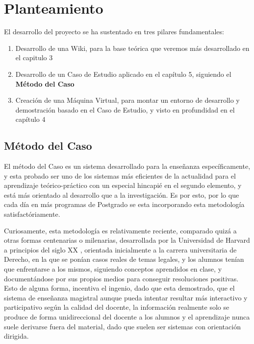
\section{Planteamiento}

El desarrollo del proyecto se ha sustentado en tres pilares fundamentales:

\begin{enumerate}
	\item Desarrollo de una Wiki, para la base teórica que veremos más desarrollado en el capitulo 3
	\item Desarrollo de un Caso de Estudio aplicado en el capítulo 5, siguiendo el \textbf{Método del Caso}
	\item Creación de una Máquina Virtual, para montar un entorno de desarrollo y demostración basado en el Caso de Estudio, y visto en profundidad en el capítulo 4
\end{enumerate}

\subsection{Método del Caso}

El método del Caso es un sistema desarrollado para la enseñanza específicamente, y esta probado ser uno de los sistemas más eficientes de la actualidad para el aprendizaje teórico-práctico con un especial hincapié en el segundo elemento, y está más orientado al desarrollo que a la investigación. Es por esto, por lo que cada día en más programas de Postgrado se esta incorporando esta metodología satisfactóriamente.

Curiosamente, esta metodología es relativamente reciente, comparado quizá a otras formas centenarias o milenarias, desarrollada por la Universidad de Harvard\cite{website:hbsp} a principios del siglo XX \cite{mdc05}, orientada inicialmente a la carrera universitaria de Derecho, en la que se ponían casos reales de temas legales, y los alumnos tenían que enfrentarse a los mismos, siguiendo conceptos aprendidos en clase, y documentándose por sus propios medios para conseguir resoluciones positivas. Esto de alguna forma, incentiva el ingenio, dado que esta demostrado, que el sistema de enseñanza magistral aunque pueda intentar resultar más interactivo y participativo según la calidad del docente, la información realmente solo se produce de forma unidireccional del docente a los alumnos y el aprendizaje nunca suele derivarse fuera del material, dado que suelen ser sistemas con orientación dirigida.

